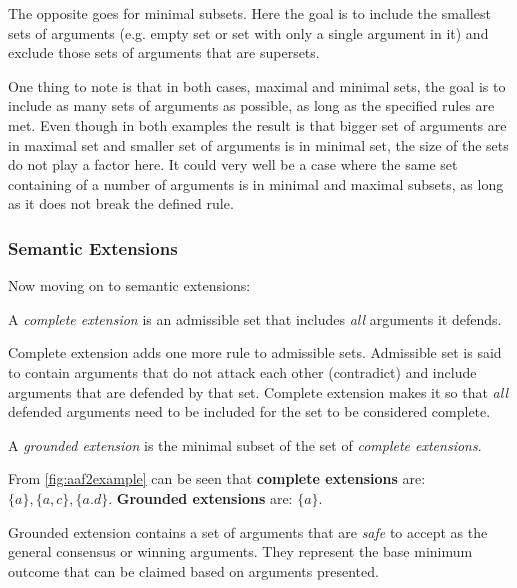             The opposite goes for minimal subsets. Here the goal is to include the smallest sets of arguments (e.g. empty set or set with only a single argument in it) and exclude those sets of arguments that are supersets. 
            
            One thing to note is that in both cases, maximal and minimal sets, the goal is to include as many sets of arguments as possible, as long as the specified rules are met. Even though in both examples the result is that bigger set of arguments are in maximal set and smaller set of arguments is in minimal set, the size of the sets do not play a factor here. It could very well be a case where the same set containing of a number of arguments is in minimal and maximal subsets, as long as it does not break the defined rule.
        
        \subsubsection{Semantic Extensions}
            Now moving on to semantic extensions:
            \begin{definition}
                A \textit{complete extension} is an admissible set that includes \textit{all} arguments it defends.
                \label{definition:definition7}
            \end{definition}
            
            Complete extension adds one more rule to admissible sets. Admissible set is said to contain arguments that do not attack each other (contradict) and include arguments that are defended by that set. Complete extension makes it so that \textit{all} defended arguments need to be included for the set to be considered complete.
            
            \begin{definition}
                A \textit{grounded extension} is the minimal subset of the set of \textit{complete extensions}.
                \label{definition:definition8}
            \end{definition}
            \begin{exa}
                From \autoref{fig:aaf2example} can be seen that \textbf{complete extensions} are: $\{a\}, \{a, c\}, \{a. d\}$. \textbf{Grounded extensions} are: $\{a\}$.
                \label{exa:example8}
            \end{exa}
            
            Grounded extension contains a set of arguments that are \textit{safe} to accept as the general consensus or winning arguments. They represent the base minimum outcome that can be claimed based on arguments presented.
            
